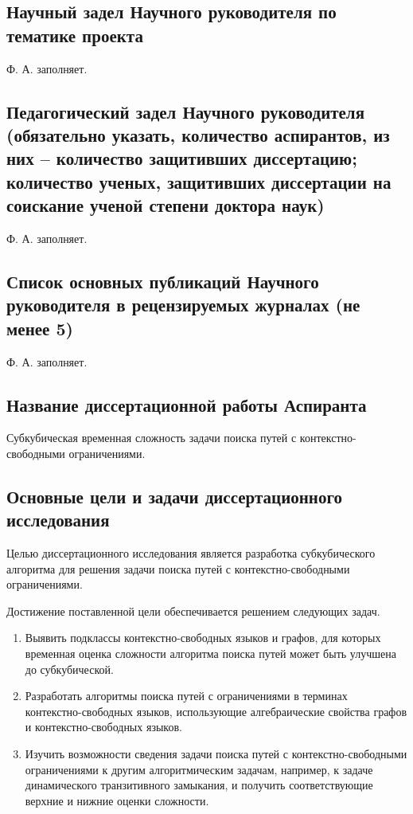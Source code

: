 \documentclass[12pt]{article}  %
\theoremstyle{remark}
\begin{document}
\subsection{Научный задел Научного руководителя по тематике проекта}
Ф. А. заполняет.

\subsection{Педагогический задел Научного руководителя (обязательно указать, количество аспирантов, из них – количество защитивших диссертацию; количество ученых, защитивших диссертации на соискание ученой степени доктора наук)}
Ф. А. заполняет.

\subsection{Список основных публикаций Научного руководителя в рецензируемых журналах (не менее 5)}
Ф. А. заполняет.

\subsection{Название диссертационной работы Аспиранта}
Субкубическая временная сложность задачи поиска путей с контекстно-свободными ограничениями.
\subsection{Основные цели и задачи диссертационного исследования}
Целью диссертационного исследования является разработка субкубического алгоритма для решения задачи поиска путей с контекстно-свободными ограничениями.

Достижение поставленной цели обеспечивается решением следующих задач.
\begin{enumerate}
\item Выявить подклассы контекстно-свободных языков и графов, для которых временная оценка сложности алгоритма поиска путей может быть улучшена до субкубической. 
\item Разработать алгоритмы поиска путей с ограничениями в терминах контекстно-свободных  языков, использующие алгебраические свойства графов и контекстно-свободных языков.
\item Изучить возможности сведения задачи поиска путей с контекстно-свободными ограничениями к другим алгоритмическим задачам, например, к задаче динамического транзитивного замыкания, и получить соответствующие верхние и нижние оценки сложности.
\end{enumerate}
\end{document}
